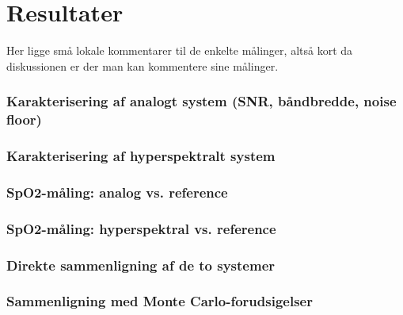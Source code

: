 \chapter{Resultater}
Her ligge små lokale kommentarer til de enkelte målinger, altså kort da diskussionen er der man kan kommentere sine målinger.

\subsection{Karakterisering af analogt system (SNR, båndbredde, noise floor)}
\subsection{Karakterisering af hyperspektralt system}
\subsection{SpO2-måling: analog vs. reference}
\subsection{SpO2-måling: hyperspektral vs. reference}
\subsection{Direkte sammenligning af de to systemer}
\subsection{Sammenligning med Monte Carlo-forudsigelser}